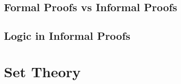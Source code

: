 \documentclass[12pt]{article}
\begin{document}
\subsection{Formal Proofs vs Informal Proofs}



\subsection{Logic in Informal Proofs}





\section{Set Theory} %
\label{sec:sets}




\end{document}
